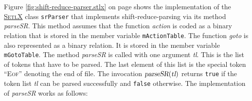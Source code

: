 Figure \ref{fig:shift-reduce-parser.stlx} on page \pageref{fig:shift-reduce-parser.stlx}
shows the implementation of the 
\href{http://randoom.org/Software/SetlX}{\textsc{SetlX}}
class \texttt{srParser} that implements
shift-reduce-parsing via its method \textsl{parseSR}.  
This method assumes that the function \textsl{action} is coded
as a binary relation that is stored in the member variable \texttt{mActionTable}.
The function \textsl{goto} is also represented as a binary relation.  It is stored in the
member variable \texttt{mGotoTable}.  The method \textsl{parseSR} is called with one
argument \textsl{tl}.  This is the list of tokens that have to be parsed.  The last
element of this list is the special token ``\textsc{Eof}'' denoting the end of file.  The invocation 
$\textsl{parseSR}(\textsl{tl})$ returns \texttt{true} if the token list \textsl{tl} can be
parsed successfully and \texttt{false} otherwise.  The implementation of \textsl{parseSR} works as follows:
